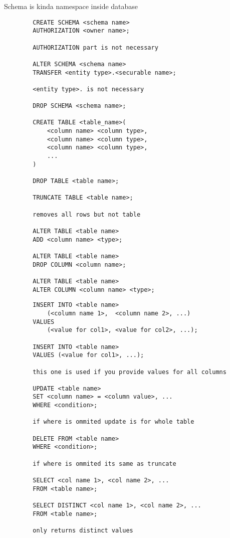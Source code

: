 \documentclass{article}
\begin{document}
    Schema is kinda namespace inside database
    \begin{verbatim}
        CREATE SCHEMA <schema name>
        AUTHORIZATION <owner name>;

        AUTHORIZATION part is not necessary

        ALTER SCHEMA <schema name>
        TRANSFER <entity type>.<securable name>;

        <entity type>. is not necessary

        DROP SCHEMA <schema name>;

        CREATE TABLE <table_name>(
            <column name> <column type>,
            <column name> <column type>,
            <column name> <column type>,
            ...
        )

        DROP TABLE <table name>;

        TRUNCATE TABLE <table name>;

        removes all rows but not table

        ALTER TABLE <table name>
        ADD <column name> <type>;

        ALTER TABLE <table name>
        DROP COLUMN <column name>;

        ALTER TABLE <table name>
        ALTER COLUMN <column name> <type>;
    \end{verbatim}

    \begin{verbatim}
        INSERT INTO <table name>
            (<column name 1>,  <column name 2>, ...)
        VALUES                  
            (<value for col1>, <value for col2>, ...);

        INSERT INTO <table name>
        VALUES (<value for col1>, ...);

        this one is used if you provide values for all columns

        UPDATE <table name>
        SET <column name> = <column value>, ...
        WHERE <condition>;

        if where is ommited update is for whole table

        DELETE FROM <table name>
        WHERE <condition>;

        if where is ommited its same as truncate

        SELECT <col name 1>, <col name 2>, ...
        FROM <table name>;

        SELECT DISTINCT <col name 1>, <col name 2>, ...
        FROM <table name>;

        only returns distinct values
    \end{verbatim}
\end{document}
